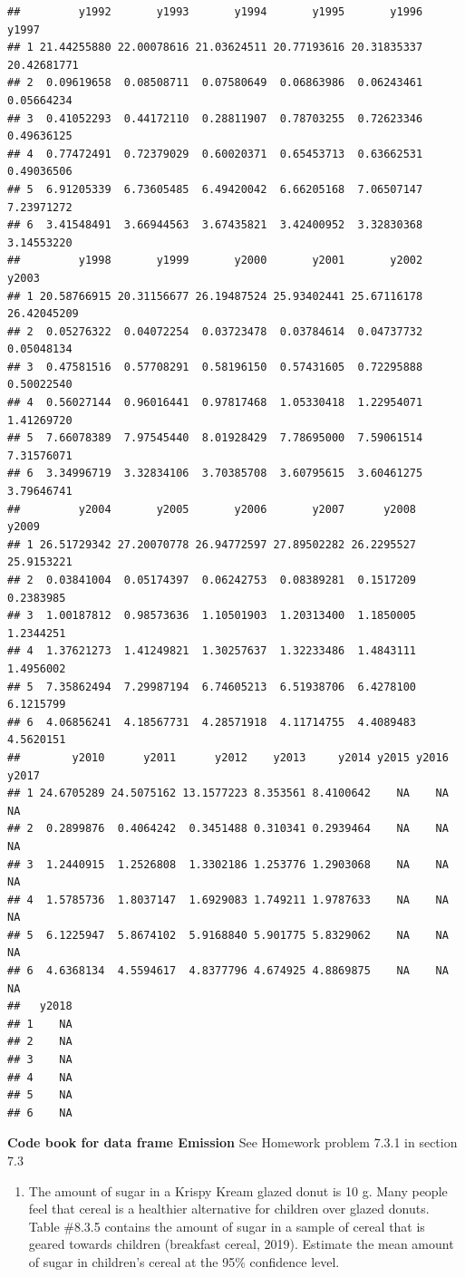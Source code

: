 \documentclass[]{book}
\providecommand{\tightlist}{%
  \setlength{\itemsep}{0pt}\setlength{\parskip}{0pt}}
\begin{document}
\begin{verbatim}
##         y1992       y1993       y1994       y1995       y1996       y1997
## 1 21.44255880 22.00078616 21.03624511 20.77193616 20.31835337 20.42681771
## 2  0.09619658  0.08508711  0.07580649  0.06863986  0.06243461  0.05664234
## 3  0.41052293  0.44172110  0.28811907  0.78703255  0.72623346  0.49636125
## 4  0.77472491  0.72379029  0.60020371  0.65453713  0.63662531  0.49036506
## 5  6.91205339  6.73605485  6.49420042  6.66205168  7.06507147  7.23971272
## 6  3.41548491  3.66944563  3.67435821  3.42400952  3.32830368  3.14553220
##         y1998       y1999       y2000       y2001       y2002       y2003
## 1 20.58766915 20.31156677 26.19487524 25.93402441 25.67116178 26.42045209
## 2  0.05276322  0.04072254  0.03723478  0.03784614  0.04737732  0.05048134
## 3  0.47581516  0.57708291  0.58196150  0.57431605  0.72295888  0.50022540
## 4  0.56027144  0.96016441  0.97817468  1.05330418  1.22954071  1.41269720
## 5  7.66078389  7.97545440  8.01928429  7.78695000  7.59061514  7.31576071
## 6  3.34996719  3.32834106  3.70385708  3.60795615  3.60461275  3.79646741
##         y2004       y2005       y2006       y2007      y2008      y2009
## 1 26.51729342 27.20070778 26.94772597 27.89502282 26.2295527 25.9153221
## 2  0.03841004  0.05174397  0.06242753  0.08389281  0.1517209  0.2383985
## 3  1.00187812  0.98573636  1.10501903  1.20313400  1.1850005  1.2344251
## 4  1.37621273  1.41249821  1.30257637  1.32233486  1.4843111  1.4956002
## 5  7.35862494  7.29987194  6.74605213  6.51938706  6.4278100  6.1215799
## 6  4.06856241  4.18567731  4.28571918  4.11714755  4.4089483  4.5620151
##        y2010      y2011      y2012    y2013     y2014 y2015 y2016 y2017
## 1 24.6705289 24.5075162 13.1577223 8.353561 8.4100642    NA    NA    NA
## 2  0.2899876  0.4064242  0.3451488 0.310341 0.2939464    NA    NA    NA
## 3  1.2440915  1.2526808  1.3302186 1.253776 1.2903068    NA    NA    NA
## 4  1.5785736  1.8037147  1.6929083 1.749211 1.9787633    NA    NA    NA
## 5  6.1225947  5.8674102  5.9168840 5.901775 5.8329062    NA    NA    NA
## 6  4.6368134  4.5594617  4.8377796 4.674925 4.8869875    NA    NA    NA
##   y2018
## 1    NA
## 2    NA
## 3    NA
## 4    NA
## 5    NA
## 6    NA
\end{verbatim}

\textbf{Code book for data frame Emission} See Homework problem 7.3.1 in section 7.3

\begin{enumerate}
\def\labelenumi{\arabic{enumi}.}
\setcounter{enumi}{1}
\tightlist
\item
  The amount of sugar in a Krispy Kream glazed donut is 10 g. Many people feel that cereal is a healthier alternative for children over glazed donuts. Table \#8.3.5 contains the amount of sugar in a sample of cereal that is geared towards children (breakfast cereal, 2019). Estimate the mean amount of sugar in children's cereal at the 95\% confidence level.
\end{enumerate}
\end{document}
